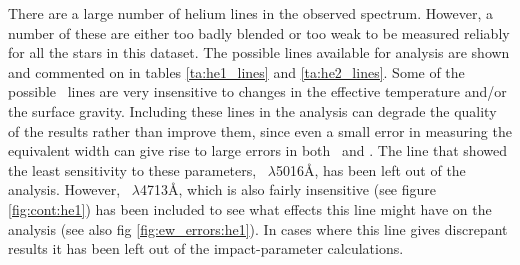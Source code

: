 There are a large number of helium lines in the observed spectrum.
However, a number of these are either too badly blended or too weak to be
measured reliably for all the stars in this dataset. The possible lines
available for analysis are shown and commented on in tables
\ref{ta:he1_lines} and \ref{ta:he2_lines}. Some of the possible \hei\ lines are very
insensitive to changes in the effective temperature and/or the surface
gravity. Including these lines in the analysis can degrade the quality
of the results rather than improve them, since even a small error in
measuring the equivalent width can give rise to large errors in both
\teff\ and \logg. The line that showed the least sensitivity to these parameters,
\hei~$\lambda$5016\AA, has been left out of the analysis. However, 
\hei~$\lambda$4713\AA, which is also fairly insensitive (see figure
\ref{fig:cont:he1}) has been included to see what effects 
this line might have on the analysis (see also fig
\ref{fig:ew_errors:he1}). In cases where this line gives discrepant
results it has been left out of the impact-parameter calculations.

